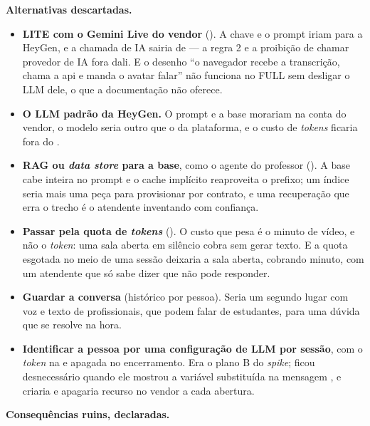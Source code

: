 \textbf{Alternativas descartadas.}

\begin{itemize}
  \item \textbf{LITE com o Gemini Live do vendor}
    (). A chave e o prompt iriam para a HeyGen, e a
    chamada de IA sairia de  --- a regra 2 e a proibição de chamar
    provedor de IA fora dali. E o desenho \enquote{o navegador recebe a
    transcrição, chama a api e manda o avatar falar} não funciona no FULL sem
    desligar o LLM dele, o que a documentação não oferece.
  \item \textbf{O LLM padrão da HeyGen.} O prompt e a base morariam na conta
    do vendor, o modelo seria outro que o da plataforma, e o custo de
    \emph{tokens} ficaria fora do .
  \item \textbf{RAG ou \emph{data store} para a base}, como o agente do
    professor (). A base cabe inteira no prompt e o cache
    implícito reaproveita o prefixo; um índice seria mais uma peça para
    provisionar por contrato, e uma recuperação que erra o trecho é o atendente
    inventando com confiança.
  \item \textbf{Passar pela quota de \emph{tokens}} (). O custo
    que pesa é o minuto de vídeo, e não o \emph{token}: uma sala aberta em
    silêncio cobra sem gerar texto. E a quota esgotada no meio de uma sessão
    deixaria a sala aberta, cobrando minuto, com um atendente que só sabe dizer
    que não pode responder.
  \item \textbf{Guardar a conversa} (histórico por pessoa). Seria um segundo
    lugar com voz e texto de profissionais, que podem falar de estudantes, para
    uma dúvida que se resolve na hora.
  \item \textbf{Identificar a pessoa por uma configuração de LLM por sessão},
    com o \emph{token} na  e apagada no encerramento. Era o plano
    B do \emph{spike}; ficou desnecessário quando ele mostrou a variável
    substituída na mensagem , e criaria e apagaria recurso no vendor a
    cada abertura.
\end{itemize}

\textbf{Consequências ruins, declaradas.}


